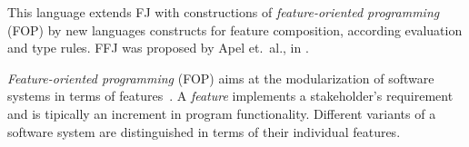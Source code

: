 This language extends FJ with constructions of \textit{feature-oriented
programming} (FOP) by new languages constructs for feature composition,
according evaluation and type rules. FFJ was proposed by Apel et.~al., in
\cite{Apel08featurefeatherweight}.

\textit{Feature-oriented programming} (FOP) aims at the modularization of
software systems in terms of features~\cite{fop}. A \textit{feature} implements
a stakeholder's requirement and is tipically an increment in program
functionality. Different variants of a software system are distinguished in
terms of their individual features.



